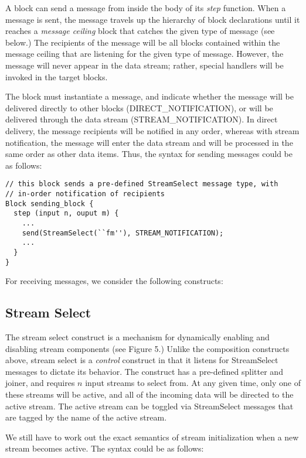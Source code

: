 A block can send a message from inside the body of its {\em step}
function.  When a message is sent, the message travels up the hierarchy
of block declarations until it reaches a {\em message ceiling} block
that catches the given type of message (see below.)  The recipients of
the message will be all blocks contained within the message ceiling that
are listening for the given type of message.  However, the message will
never appear in the data stream; rather, special handlers will be
invoked in the target blocks.

The block must instantiate a message, and indicate whether the message
will be delivered directly to other blocks (DIRECT\_NOTIFICATION), or
will be delivered through the data stream (STREAM\_NOTIFICATION).  In
direct delivery, the message recipients will be notified in any order,
whereas with stream notification, the message will enter the data stream
and will be processed in the same order as other data items.  Thus, the
syntax for sending messages could be as follows:

\begin{verbatim}
// this block sends a pre-defined StreamSelect message type, with
// in-order notification of recipients
Block sending_block {
  step (input n, ouput m) {
    ...
    send(StreamSelect(``fm''), STREAM_NOTIFICATION);
    ...
  }
}
\end{verbatim}

For receiving messages, we consider the following constructs:

\subsection{Stream Select}

The stream select construct is a mechanism for dynamically enabling and
disabling stream components (see Figure 5.)  Unlike the composition
constructs above, stream select is a {\em control} construct in that it
listens for StreamSelect messages to dictate its behavior.  The
construct has a pre-defined splitter and joiner, and requires $n$ input
streams to select from.  At any given time, only one of these streams
will be active, and all of the incoming data will be directed to the
active stream.  The active stream can be toggled via StreamSelect
messages that are tagged by the name of the active stream.

We still have to work out the exact semantics of stream initialization
when a new stream becomes active.  The syntax could be as follows:


